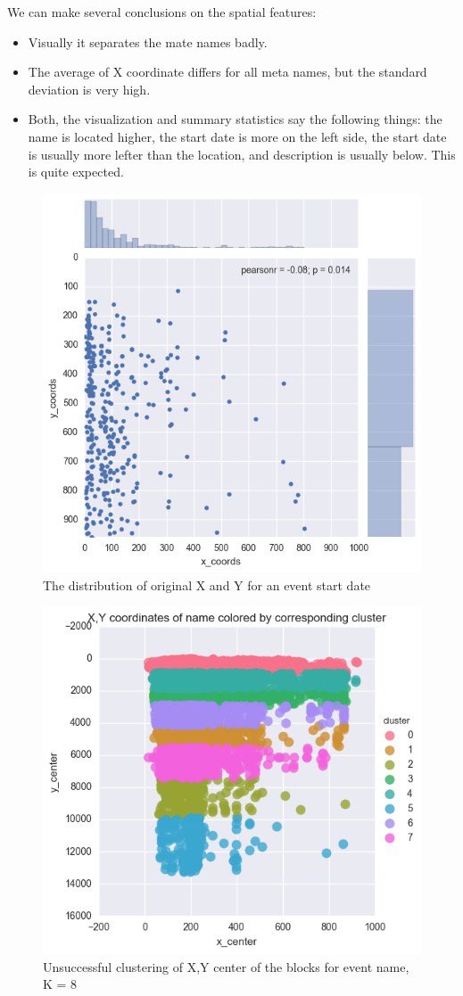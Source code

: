 We can make several conclusions on the spatial features:
\begin{itemize}
    \item Visually it separates the mate names badly.
    \item The average of X coordinate differs for all meta names, but the standard deviation is very high.
    \item Both, the visualization and summary statistics say the following things: the name is located higher, the start date is more on the left side, the start date is usually more lefter than the location, and description is usually below. This is quite expected.   
\end{itemize}

\begin{figure}[h]
\begin{center}
\includegraphics[width=.6\textwidth]{figures07/startDateXY}
\caption{The distribution of original X and Y for an event start date}
\label{fig:startDateXY}
\end{center}
\end{figure}


\begin{figure}[h]
\begin{center}
\includegraphics[width=.6\textwidth]{figures07/nameXYCluster8}
\caption{Unsuccessful clustering of X,Y center of the blocks for event name, K = 8}
\label{fig:nameXYCluster8}
\end{center}
\end{figure}    

